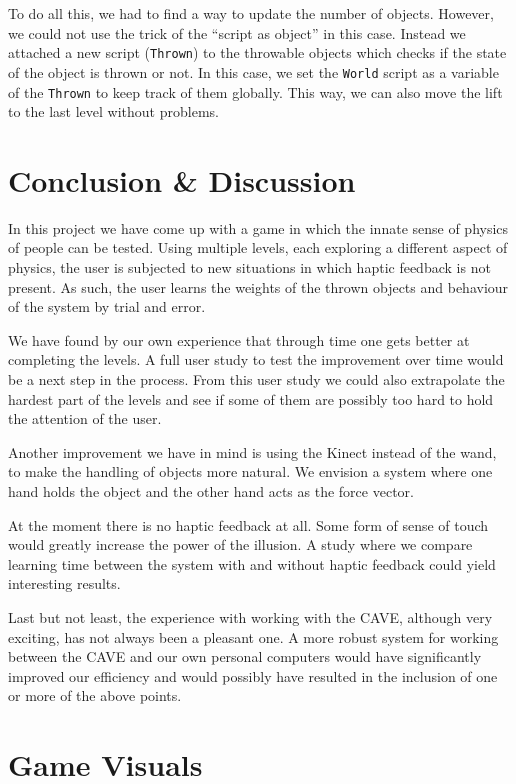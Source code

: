 \documentclass[a4paper]{article}
\begin{document}
To do all this, we had to find a way to update the number of objects.
However, we could not use the trick of the ``script as object'' in this case.
Instead we attached a new script (\verb!Thrown!) to the throwable objects which
checks if the state of the object is thrown or not. In this case, we set the
\verb!World! script as a variable of the \verb!Thrown! to keep track of them
globally. This way, we can also move the lift to the last level without problems.

\section{Conclusion \& Discussion}
\label{sec:discuss}
In this project we have come up with a game in which the innate sense of physics
of people can be tested. Using multiple levels, each exploring a different aspect
of physics, the user is subjected to new situations in which haptic feedback is
not present. As such, the user learns the weights of the thrown objects and behaviour of the 
system by trial and error.

We have found by our own experience that through time one gets better at completing the levels.
A full user study to test the improvement over time would be a next step in the process.
From this user study we could also extrapolate the hardest part of the levels and see if
some of them are possibly too hard to hold the attention of the user.

Another improvement we have in mind is using the Kinect instead of the wand, to make the handling
of objects more natural. We envision a system where one hand holds the object and the other hand
acts as the force vector.

At the moment there is no haptic feedback at all. Some form of sense of touch would greatly increase
the power of the illusion. A study where we compare learning time between the system with and without
haptic feedback could yield interesting results.

Last but not least, the experience with working with the CAVE, although very exciting, has not always been a pleasant one.
A more robust system for working between the CAVE and our own personal computers would have
significantly improved our efficiency and would possibly have resulted in the inclusion of one or more of the above points.

\section{Game Visuals}
\end{document}
